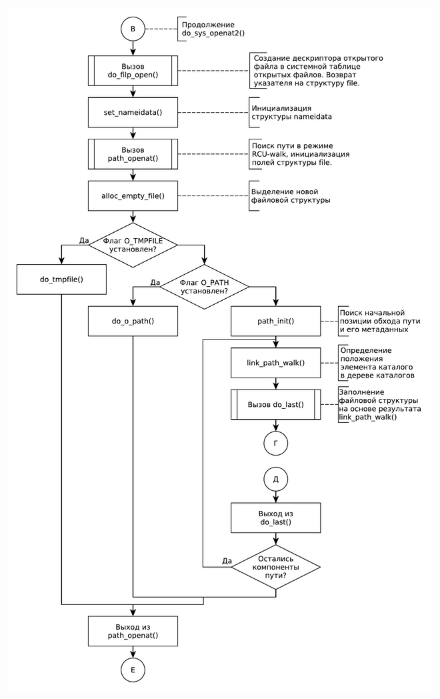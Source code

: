 \documentclass[a4paper,oneside,12pt]{extreport}
\begin{document}
\begin{figure}[H]
	\centering
	\includegraphics[scale=0.67]{inc/img/open4}
\end{figure}
\end{document}

